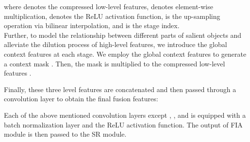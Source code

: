 \documentclass[letterpaper]{article} \usepackage{aaai20}  \usepackage{times}  \usepackage{helvet} \usepackage{courier}  \usepackage[hyphens]{url}  \usepackage{graphicx} \urlstyle{rm} \def\UrlFont{\rm}  \usepackage{graphicx}  \frenchspacing  \setlength{\pdfpagewidth}{8.5in}  \setlength{\pdfpageheight}{11in}
\begin{document}
where  denotes the compressed low-level features,  denotes element-wise multiplication,  denotes the ReLU activation function,  is the up-sampling operation via bilinear interpolation, and  is the stage index. \\
\indent Further, to model the relationship between different parts of salient objects and alleviate the dilution process of high-level features, we introduce the global context features  at each stage. We employ the global context features  to generate a context mask 
. Then, the mask  is multiplied to the compressed low-level features . 

Finally, these three level features are concatenated and then passed through a  convolution layer to 
obtain the final fusion features:

Each of the above mentioned convolution layers except , , and  is equipped with a batch normalization layer and the ReLU activation function.
The output of FIA module is then passed to the SR module.
\end{document}
